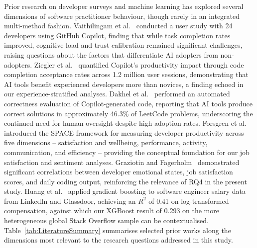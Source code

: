 \documentclass[journal, onecolumn]{IEEEtran}
\begin{document}
Prior research on developer surveys and machine learning has explored several dimensions of software practitioner behaviour, though rarely in an integrated multi-method fashion.
Vaithilingam et al.~\cite{vaithilingam2022expectation} conducted a user study with 24 developers using GitHub Copilot, finding that while task completion rates improved, cognitive load and trust calibration remained significant challenges, raising questions about the factors that differentiate AI adopters from non-adopters.
Ziegler et al.~\cite{ziegler2022productivity} quantified Copilot's productivity impact through code completion acceptance rates across 1.2 million user sessions, demonstrating that AI tools benefit experienced developers more than novices, a finding echoed in our experience-stratified analyses.
Dakhel et al.~\cite{dakhel2023github} performed an automated correctness evaluation of Copilot-generated code, reporting that AI tools produce correct solutions in approximately 46.3\% of LeetCode problems, underscoring the continued need for human oversight despite high adoption rates.
Forsgren et al.~\cite{forsgren2021space} introduced the SPACE framework for measuring developer productivity across five dimensions -- satisfaction and wellbeing, performance, activity, communication, and efficiency -- providing the conceptual foundation for our job satisfaction and sentiment analyses.
Graziotin and Fagerholm~\cite{graziotin2022happiness} demonstrated significant correlations between developer emotional states, job satisfaction scores, and daily coding output, reinforcing the relevance of RQ4 in the present study.
Huang et al.~\cite{huang2022predicting} applied gradient boosting to software engineer salary data from LinkedIn and Glassdoor, achieving an $R^2$ of 0.41 on log-transformed compensation, against which our XGBoost result of 0.293 on the more heterogeneous global Stack Overflow sample can be contextualised.
Table~\ref{tab:LiteratureSummary} summarises selected prior works along the dimensions most relevant to the research questions addressed in this study.
\end{document}
